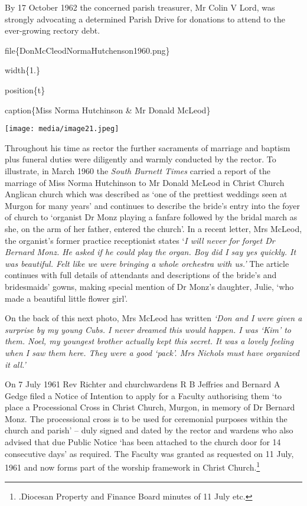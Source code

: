By 17 October 1962 the concerned parish treasurer, Mr Colin V Lord, was
strongly advocating a determined Parish Drive for donations to attend to
the ever-growing rectory debt.

file\{DonMcCleodNormaHutchenson1960.png\}

width\{1.\}

position\{t\}

caption\{Miss Norma Hutchinson \& Mr Donald McLeod\}

\texttt{[image: media/image21.jpeg]}

Throughout his time as rector the further sacraments of marriage and
baptism plus funeral duties were diligently and warmly conducted by the
rector. To illustrate, in March 1960 the \emph{South Burnett Times}
carried a report of the marriage of Miss Norma Hutchinson to Mr Donald
McLeod in Christ Church Anglican church which was described as `one of
the prettiest weddings seen at Murgon for many years' and continues to
describe the bride's entry into the foyer of church to `organist Dr Monz
playing a fanfare followed by the bridal march as she, on the arm of her
father, entered the church'. In a recent letter, Mrs McLeod, the
organist's former practice receptionist states `\emph{I will never for
forget Dr Bernard Monz. He asked if he could play the organ. Boy did I
say yes quickly. It was beautiful. Felt like we were bringing a whole
orchestra with us.'} The article continues with full details of
attendants and descriptions of the bride's and bridesmaids' gowns,
making special mention of Dr Monz's daughter, Julie, `who made a
beautiful little flower girl'.

On the back of this next photo, Mrs McLeod has written \emph{`Don and I
were given a surprise by my young Cubs. I never dreamed this would
happen. I was `Kim' to them. Noel, my youngest brother actually kept
this secret. It was a lovely feeling when I saw them here. They were a
good `pack'. Mrs Nichols must have organized it} \emph{all.'}

On 7 July 1961 Rev Richter and churchwardens R B Jeffries and Bernard A
Gedge filed a Notice of Intention to apply for a Faculty authorising
them `to place a Processional Cross in Christ Church, Murgon, in memory
of Dr Bernard Monz. The processional cross is to be used for ceremonial
purposes within the church and parish' -- duly signed and dated by the
rector and wardens who also advised that due Public Notice `has been
attached to the church door for 14 consecutive days' as required. The
Faculty was granted as requested on 11 July, 1961 and now forms part of
the worship framework in Christ Church.\footnote{.Diocesan Property and
  Finance Board minutes of 11 July etc.}

